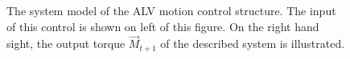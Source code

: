 \begin{figure}[H]
\begin{center}
\begin{tikzpicture}
\end{tikzpicture}
\caption{The system model of the ALV motion control structure. The input of this control is shown on left of this figure. On the right hand sight, the output torque $\vec{M}_{t+1}$ of the described system is illustrated.}
\label{fig: consensctrl}
\end{center}
\end{figure}